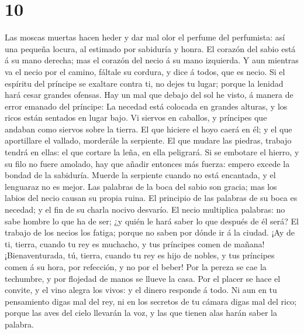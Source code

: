 \hypertarget{section-9}{%
\section{10}\label{section-9}}

 Las moscas muertas hacen heder y dar mal olor el perfume
del perfumista: así una pequeña locura, al estimado por sabiduría y
honra.  El corazón del sabio está á su mano derecha; mas
el corazón del necio á su mano izquierda.  Y aun mientras
va el necio por el camino, fáltale su cordura, y dice á todos, que es
necio.  Si el espíritu del príncipe se exaltare contra ti,
no dejes tu lugar; porque la lenidad hará cesar grandes ofensas.
 Hay un mal que debajo del sol he visto, á manera de error
emanado del príncipe:  La necedad está colocada en grandes
alturas, y los ricos están sentados en lugar bajo.  Vi
siervos en caballos, y príncipes que andaban como siervos sobre la
tierra.  El que hiciere el hoyo caerá en él; y el que
aportillare el vallado, morderále la serpiente.  El que
mudare las piedras, trabajo tendrá en ellas: el que cortare la leña, en
ella peligrará.  Si se embotare el hierro, y su filo no
fuere amolado, hay que añadir entonces más fuerza: empero excede la
bondad de la sabiduría.  Muerde la serpiente cuando no
está encantada, y el lenguaraz no es mejor.  Las palabras
de la boca del sabio son gracia; mas los labios del necio causan su
propia ruina.  El principio de las palabras de su boca es
necedad; y el fin de su charla nocivo desvarío.  El necio
multiplica palabras: no sabe hombre lo que ha de ser; ¿y quién le hará
saber lo que después de él será?  El trabajo de los
necios los fatiga; porque no saben por dónde ir á la ciudad.
 ¡Ay de ti, tierra, cuando tu rey es muchacho, y tus
príncipes comen de mañana!  ¡Bienaventurada, tú, tierra,
cuando tu rey es hijo de nobles, y tus príncipes comen á su hora, por
refección, y no por el beber!  Por la pereza se cae la
techumbre, y por flojedad de manos se llueve la casa. 
Por el placer se hace el convite, y el vino alegra los vivos: y el
dinero responde á todo.  Ni aun en tu pensamiento digas
mal del rey, ni en los secretos de tu cámara digas mal del rico; porque
las aves del cielo llevarán la voz, y las que tienen alas harán saber la
palabra.

